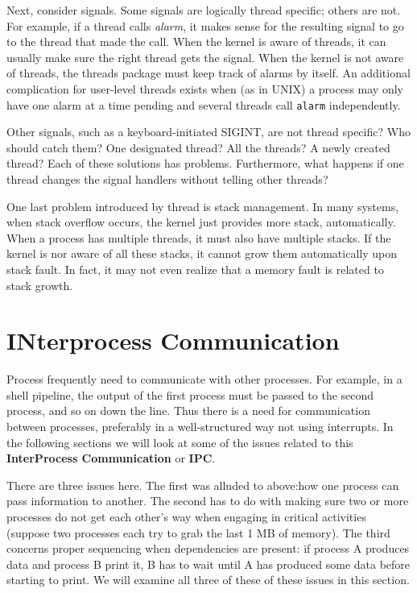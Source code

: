 \documentclass{book}
\newcommand {\kw}  [1] {\textbf{#1}}
\newcommand {\sys} [1] {\textsl{#1}}
\newcommand {\cmd} [1] {\texttt{#1}}
\begin{document}
Next, consider signals.
Some signals are logically thread specific; others are not.
For example, if a thread calls \sys{alarm}, it makes sense for the resulting signal to go to the thread that made the call.
When the kernel is aware of threads, it can usually make sure the right thread gets the signal.
When the kernel is not aware of threads, the threads package must keep track of alarms by itself.
An additional complication for user-level threads exists when (as in UNIX) a process may only have one alarm at a time pending
and several threads call \cmd{alarm} independently.

Other signals, such as a keyboard-initiated SIGINT, are not thread specific?
Who should catch them?
One designated thread?
All the threads?
A newly created thread?
Each of these solutions has problems.
Furthermore, what happens if one thread changes the signal handlers without telling other threads?

One last problem introduced by thread is stack management.
In many systems, when stack overflow occurs, the kernel just provides more stack, automatically.
When a process has multiple threads, it must also have multiple stacks.
If the kernel is nor aware of all these stacks, it cannot grow them automatically upon stack fault.
In fact, it may not even realize that a memory fault is related to stack growth.
 
\section{INterprocess Communication}
Process frequently need to communicate with other processes.
For example, in a shell pipeline, the output of the first process must be passed to the second process, and so on down the line.
Thus there is a need for communication between processes, 
preferably in a well-structured way not using interrupts.
In the following sections we will look at some of the issues related to this \kw{InterProcess Communication} or \kw{IPC}.

There are three issues here.
The first was alluded to above:how one process can pass information to another.
The second has to do with making sure two or more processes do not get each other's way 
when engaging in critical activities (suppose two processes each try to grab the last 1 MB of memory).
The third concerns proper sequencing when dependencies are present: if process A produces data and process B print it, 
B has to wait until A has produced some data before starting to print.
We will examine all three of these of these issues in this section.
\end{document}
